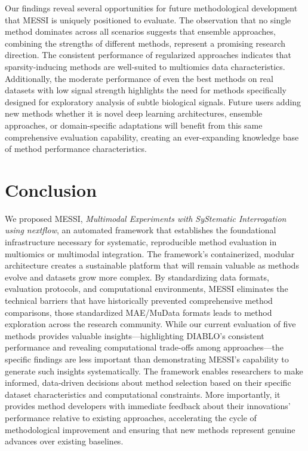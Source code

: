 \documentclass[
]{article}
\begin{document}
Our findings reveal several opportunities for future methodological development that MESSI is uniquely positioned to evaluate. The observation that no single method dominates across all scenarios suggests that ensemble approaches, combining the strengths of different methods, represent a promising research direction. The consistent performance of regularized approaches indicates that sparsity-inducing methods are well-suited to multiomics data characteristics. Additionally, the moderate performance of even the best methods on real datasets with low signal strength highlights the need for methods specifically designed for exploratory analysis of subtle biological signals. Future users adding new methods whether it is novel deep learning architectures, ensemble approaches, or domain-specific adaptations will benefit from this same comprehensive evaluation capability, creating an ever-expanding knowledge base of method performance characteristics.

\hypertarget{conclusion}{%
\section{Conclusion}\label{conclusion}}

We proposed MESSI, \emph{Multimodal Experiments with SyStematic Interrogation using nextflow}, an automated framework that establishes the foundational infrastructure necessary for systematic, reproducible method evaluation in multiomics or multimodal integration. The framework's containerized, modular architecture creates a sustainable platform that will remain valuable as methods evolve and datasets grow more complex. By standardizing data formats, evaluation protocols, and computational environments, MESSI eliminates the technical barriers that have historically prevented comprehensive method comparisons, those standardized MAE/MuData formats leads to method exploration across the research community. While our current evaluation of five methods provides valuable insights---highlighting DIABLO's consistent performance and revealing computational trade-offs among approaches---the specific findings are less important than demonstrating MESSI's capability to generate such insights systematically. The framework enables researchers to make informed, data-driven decisions about method selection based on their specific dataset characteristics and computational constraints. More importantly, it provides method developers with immediate feedback about their innovations' performance relative to existing approaches, accelerating the cycle of methodological improvement and ensuring that new methods represent genuine advances over existing baselines.
\end{document}
